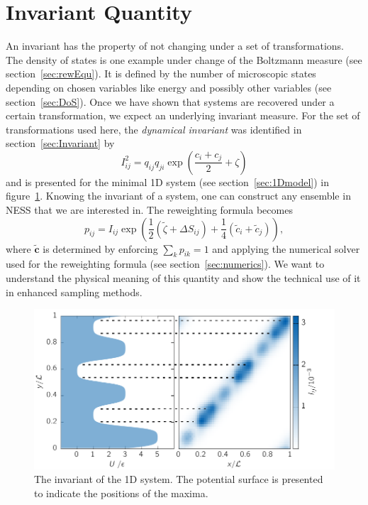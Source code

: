 
\section{Invariant Quantity}
\label{sec:InvariantC}
An invariant has the property of not changing under a set of transformations. The density of states is one example under change of the Boltzmann measure (see section~\ref{sec:rewEqu}). It is defined by the number of microscopic states depending on chosen variables like energy and possibly other variables (see section~\ref{sec:DoS}). Once we have shown that systems are recovered under a certain transformation, we expect an underlying invariant measure. For the set of transformations used here, the \textit{dynamical invariant} was identified in section~\ref{sec:Invariant} by
\begin{equation}
    I_{ij}^2 = q_{ij} q_{ji} \exp \left ( \frac{c_i + c_j}{2}+ \zeta \right ) 
\end{equation}
and is presented for the minimal 1D system (see section~\ref{sec:1Dmodel}) in figure~\ref{fig:invariant}. Knowing the invariant of a system, one can construct any ensemble in NESS that we are interested in. The reweighting formula becomes
\begin{equation}
 p_{ij} = I_{ij} \exp \left ( \frac{1}{2} ( \tilde \zeta + \Delta S_{ij} )+ \frac{1}{4} (\tilde c_i + \tilde c_j)\right ),
\end{equation}
where $\mathbf{\tilde c}$ is determined by enforcing $\sum_k p_{ik}=1$ and applying the numerical solver used for the reweighting formula (see section~\ref{sec:numerics}). We want to understand the physical meaning of this quantity and show the technical use of it in enhanced sampling methods. 

\begin{figure}
 \includegraphics{../plots/Complementary/Invariant_2010.pdf}
 \caption[The dynamical invariant of the 1D driven system.]{The invariant of the 1D system. The potential surface is presented to indicate the positions of the maxima.}
 \label{fig:invariant}
\end{figure}

